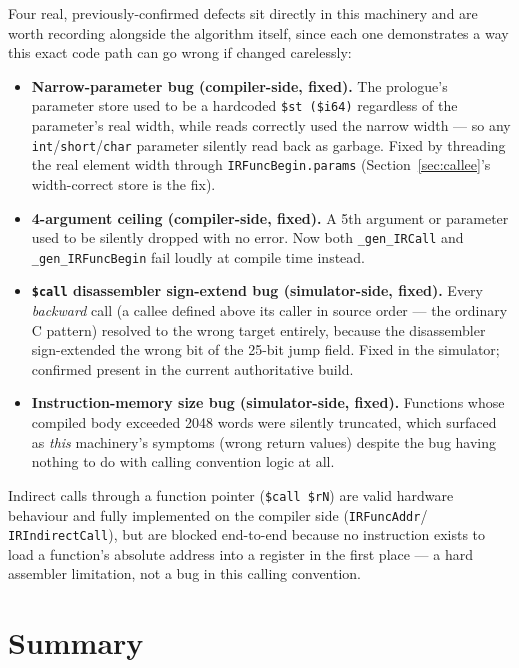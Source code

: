 \documentclass[11pt,a4paper]{article}
\begin{document}
Four real, previously-confirmed defects sit directly in this machinery and are worth
recording alongside the algorithm itself, since each one demonstrates a way this exact
code path can go wrong if changed carelessly:
\begin{itemize}
  \item \textbf{Narrow-parameter bug (compiler-side, fixed).} The prologue's parameter
        store used to be a hardcoded \texttt{\$st (\$i64)} regardless of the parameter's
        real width, while reads correctly used the narrow width --- so any
        \texttt{int}/\texttt{short}/\texttt{char} parameter silently read back as garbage.
        Fixed by threading the real element width through \texttt{IRFuncBegin.params}
        (Section~\ref{sec:callee}'s width-correct store is the fix).
  \item \textbf{4-argument ceiling (compiler-side, fixed).} A 5th argument or parameter
        used to be silently dropped with no error. Now both \texttt{\_gen\_IRCall} and
        \texttt{\_gen\_IRFuncBegin} fail loudly at compile time instead.
  \item \textbf{\texttt{\$call} disassembler sign-extend bug (simulator-side, fixed).}
        Every \emph{backward} call (a callee defined above its caller in source order ---
        the ordinary C pattern) resolved to the wrong target entirely, because the
        disassembler sign-extended the wrong bit of the 25-bit jump field. Fixed in the
        simulator; confirmed present in the current authoritative build.
  \item \textbf{Instruction-memory size bug (simulator-side, fixed).} Functions whose
        compiled body exceeded 2048 words were silently truncated, which surfaced as
        \emph{this} machinery's symptoms (wrong return values) despite the bug having
        nothing to do with calling convention logic at all.
\end{itemize}
Indirect calls through a function pointer (\texttt{\$call \$rN}) are valid hardware
behaviour and fully implemented on the compiler side (\texttt{IRFuncAddr}/
\texttt{IRIndirectCall}), but are blocked end-to-end because no instruction exists to load
a function's absolute address into a register in the first place --- a hard assembler
limitation, not a bug in this calling convention.

\section{Summary}
\end{document}
